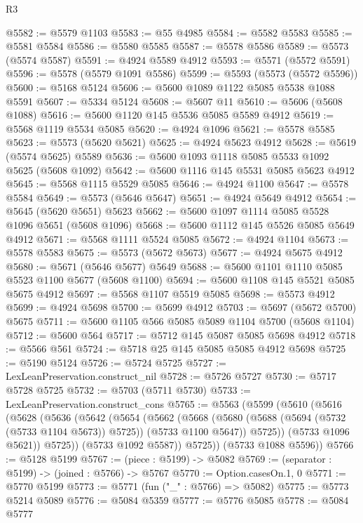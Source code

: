 \begin{lexlean}{R3}
\begin{coremodule}
@5582 := @5579 @1103
@5583 := @55 @4985
@5584 := @5582 @5583
@5585 := @5581 @5584
@5586 := @5580 @5585
@5587 := @5578 @5586
@5589 := @5573 (@5574 @5587)
@5591 := @4924 @5589 @4912
@5593 := @5571 (@5572 @5591)
@5596 := @5578 (@5579 @1091 @5586)
@5599 := @5593 (@5573 (@5572 @5596))
@5600 := @5168 @5124
@5606 := @5600 @1089 @1122 @5085 @5538 @1088 @5591
@5607 := @5334 @5124
@5608 := @5607 @11
@5610 := @5606 (@5608 @1088)
@5616 := @5600 @1120 @145 @5536 @5085 @5589 @4912
@5619 := @5568 @1119 @5534 @5085
@5620 := @4924 @1096
@5621 := @5578 @5585
@5623 := @5573 (@5620 @5621)
@5625 := @4924 @5623 @4912
@5628 := @5619 (@5574 @5625) @5589
@5636 := @5600 @1093 @1118 @5085 @5533 @1092 @5625 (@5608 @1092)
@5642 := @5600 @1116 @145 @5531 @5085 @5623 @4912
@5645 := @5568 @1115 @5529 @5085
@5646 := @4924 @1100
@5647 := @5578 @5584
@5649 := @5573 (@5646 @5647)
@5651 := @4924 @5649 @4912
@5654 := @5645 (@5620 @5651) @5623
@5662 := @5600 @1097 @1114 @5085 @5528 @1096 @5651 (@5608 @1096)
@5668 := @5600 @1112 @145 @5526 @5085 @5649 @4912
@5671 := @5568 @1111 @5524 @5085
@5672 := @4924 @1104
@5673 := @5578 @5583
@5675 := @5573 (@5672 @5673)
@5677 := @4924 @5675 @4912
@5680 := @5671 (@5646 @5677) @5649
@5688 := @5600 @1101 @1110 @5085 @5523 @1100 @5677 (@5608 @1100)
@5694 := @5600 @1108 @145 @5521 @5085 @5675 @4912
@5697 := @5568 @1107 @5519 @5085
@5698 := @5573 @4912
@5699 := @4924 @5698
@5700 := @5699 @4912
@5703 := @5697 (@5672 @5700) @5675
@5711 := @5600 @1105 @566 @5085 @5089 @1104 @5700 (@5608 @1104)
@5712 := @5600 @564
@5717 := @5712 @145 @5087 @5085 @5698 @4912
@5718 := @5566 @561
@5724 := @5718 @25 @145 @5085 @5085 @4912 @5698
@5725 := @5190 @5124
@5726 := @5724 @5725
@5727 := LexLeanPreservation.construct_nil
@5728 := @5726 @5727
@5730 := @5717 @5728 @5725
@5732 := @5703 (@5711 @5730)
@5733 := LexLeanPreservation.construct_cons
@5765 := @5563
    (@5599
      (@5610
        (@5616
          (@5628
            (@5636
              (@5642
                (@5654
                  (@5662
                    (@5668
                      (@5680 (@5688 (@5694 (@5732 (@5733 @1104 @5673)) @5725)) (@5733 @1100 @5647))
                      @5725))
                  (@5733 @1096 @5621))
                @5725))
            (@5733 @1092 @5587))
          @5725))
      (@5733 @1088 @5596))
@5766 := @5128 @5199
@5767 := (piece : @5199) -> @5082
@5769 := (separator : @5199) -> (joined : @5766) -> @5767
@5770 := Option.casesOn.{1, 0}
@5771 := @5770 @5199
@5773 := @5771 (fun ("_" : @5766) => @5082)
@5775 := @5773 @5214 @5089
@5776 := @5084 @5359
@5777 := @5776 @5085
@5778 := @5084 @5777

\end{coremodule}
\end{lexlean}
